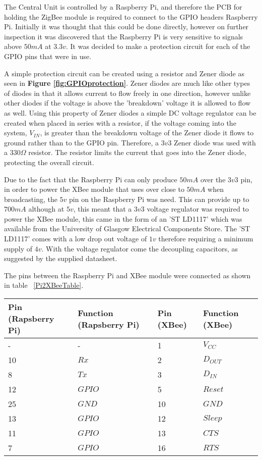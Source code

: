 

The Central Unit is controlled by a Raspberry Pi, and therefore the PCB for holding the ZigBee module is required to connect to the GPIO headers Raspberry Pi.  Initially it was thought that this could be done directly, however on further inspection it was discovered that the Raspberry Pi is very sensitive to signals above \(50mA\) at \(3.3v\). It was decided to make a protection circuit for each of the GPIO pins that were in use. 

A simple protection circuit can be created using a resistor and Zener diode as seen in \textbf{Figure \ref{fig:GPIOprotection}}.  Zener diodes are much like other types of diodes in that it allows current to flow freely in one direction, however unlike other diodes if the voltage is above the 'breakdown' voltage it is allowed to flow as well. Using this property of Zener diodes a simple DC voltage regulator can be created when placed in series with a resistor, if the voltage coming into the system, \(V_{IN}\), is greater than the breakdown voltage of the Zener diode it flows to ground rather than to the GPIO pin. Therefore, a \(3v3\) Zener diode was used with a \(330\Omega\) resistor. The resistor limits the current that goes into the Zener diode, protecting the overall circuit.

Due to the fact that the Raspberry Pi can only produce $50mA$ over the $3v3$ pin, in order to power the XBee module that uses over close to $50mA$ when broadcasting, the $5v$ pin on the Raspberry Pi was need. This can provide up to $700mA$ although at $5v$, this meant that a $3v3$ voltage regulator was required to power the XBee module, this came in the form of an 'ST LD1117' which was available from the University of Glasgow Electrical Components Store. The 'ST LD1117' comes with a low drop out voltage of $1v$ therefore requiring a minimum supply of $4v$. With the voltage regulator come the decoupling capacitors, as suggested by the supplied datasheet.

The pins between the Raspberry Pi and XBee module were connected as shown in table ~\ref{Pi2XBeeTable}.


\begin{center}
  \begin{tabular}{| l | l | l | l |}
    \hline
    \bf{Pin (Rapsberry Pi)} & \bf{Function (Rapsberry Pi)} & \bf{Pin (XBee)} & \bf{Function (XBee)} \\ \hline
     - & - & 1 & \(V_{CC}\) \\ \hline
	10 & \(Rx\) & 2 & \(D_{OUT}\) \\ \hline
	8 & \(Tx\) & 3 & \(D_{IN}\) \\ \hline
	12 & \(GPIO\) & 5 & \(Reset\) \\ \hline
	25 & \(GND\) & 10 & \(GND\) \\ \hline
	13 & \(GPIO\) & 12 & \(Sleep\) \\ \hline
	11 & \(GPIO\) & 13 & \(CTS\) \\ \hline
	7 & \(GPIO\) & 16 & \(RTS\) \\
    \hline
  \end{tabular}
\label{Pi2XBeeTable}
\end{center}


